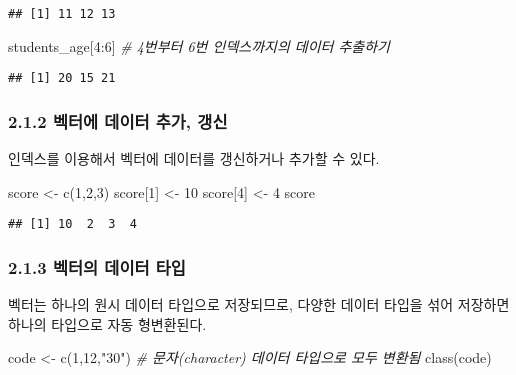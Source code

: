 \documentclass[
]{article}
\newenvironment{Shaded}{\begin{snugshade}}{\end{snugshade}}
\newcommand{\CommentTok}[1]{\textcolor[rgb]{0.56,0.35,0.01}{\textit{#1}}}
\newcommand{\DecValTok}[1]{\textcolor[rgb]{0.00,0.00,0.81}{#1}}
\newcommand{\FunctionTok}[1]{\textcolor[rgb]{0.00,0.00,0.00}{#1}}
\newcommand{\NormalTok}[1]{#1}
\newcommand{\OtherTok}[1]{\textcolor[rgb]{0.56,0.35,0.01}{#1}}
\newcommand{\SpecialCharTok}[1]{\textcolor[rgb]{0.00,0.00,0.00}{#1}}
\newcommand{\StringTok}[1]{\textcolor[rgb]{0.31,0.60,0.02}{#1}}
\begin{document}
\begin{verbatim}
## [1] 11 12 13
\end{verbatim}

\begin{Shaded}
\begin{Highlighting}[]
\NormalTok{students\_age[}\DecValTok{4}\SpecialCharTok{:}\DecValTok{6}\NormalTok{]  }\CommentTok{\# 4번부터 6번 인덱스까지의 데이터 추출하기}
\end{Highlighting}
\end{Shaded}

\begin{verbatim}
## [1] 20 15 21
\end{verbatim}

\hypertarget{uxbca1uxd130uxc5d0-uxb370uxc774uxd130-uxcd94uxac00-uxac31uxc2e0}{%
\subsubsection{2.1.2 벡터에 데이터 추가,
갱신}\label{uxbca1uxd130uxc5d0-uxb370uxc774uxd130-uxcd94uxac00-uxac31uxc2e0}}

인덱스를 이용해서 벡터에 데이터를 갱신하거나 추가할 수 있다.

\begin{Shaded}
\begin{Highlighting}[]
\NormalTok{score }\OtherTok{\textless{}{-}} \FunctionTok{c}\NormalTok{(}\DecValTok{1}\NormalTok{,}\DecValTok{2}\NormalTok{,}\DecValTok{3}\NormalTok{)}
\NormalTok{score[}\DecValTok{1}\NormalTok{] }\OtherTok{\textless{}{-}} \DecValTok{10}
\NormalTok{score[}\DecValTok{4}\NormalTok{] }\OtherTok{\textless{}{-}} \DecValTok{4}
\NormalTok{score}
\end{Highlighting}
\end{Shaded}

\begin{verbatim}
## [1] 10  2  3  4
\end{verbatim}

\hypertarget{uxbca1uxd130uxc758-uxb370uxc774uxd130-uxd0c0uxc785}{%
\subsubsection{2.1.3 벡터의 데이터
타입}\label{uxbca1uxd130uxc758-uxb370uxc774uxd130-uxd0c0uxc785}}

벡터는 하나의 원시 데이터 타입으로 저장되므로, 다양한 데이터 타입을 섞어
저장하면 하나의 타입으로 자동 형변환된다.

\begin{Shaded}
\begin{Highlighting}[]
\NormalTok{code }\OtherTok{\textless{}{-}} \FunctionTok{c}\NormalTok{(}\DecValTok{1}\NormalTok{,}\DecValTok{12}\NormalTok{,}\StringTok{"30"}\NormalTok{)  }\CommentTok{\# 문자(character) 데이터 타입으로 모두 변환됨}
\FunctionTok{class}\NormalTok{(code) }
\end{Highlighting}
\end{Shaded}
\end{document}
